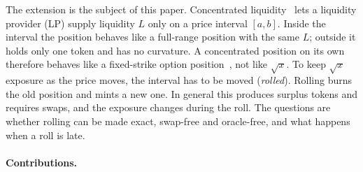 \documentclass[11pt]{article}
\theoremstyle{definition}
\theoremstyle{remark}
\begin{document}
The extension is the subject of this paper. Concentrated liquidity~\cite{adams2021uniswap} lets a liquidity provider (LP) supply liquidity $L$ only on a price interval $[a,b]$. Inside the interval the position behaves like a full-range position with the same $L$; outside it holds only one token and has no curvature. A concentrated position on its own therefore behaves like a fixed-strike option position~\cite{lambert2022panoptic}, not like $\sqrt{x}$. To keep $\sqrt{x}$ exposure as the price moves, the interval has to be moved (\emph{rolled}). Rolling burns the old position and mints a new one. In general this produces surplus tokens and requires swaps, and the exposure changes during the roll. The questions are whether rolling can be made exact, swap-free and oracle-free, and what happens when a roll is late.

\paragraph{Contributions.}
\end{document}
